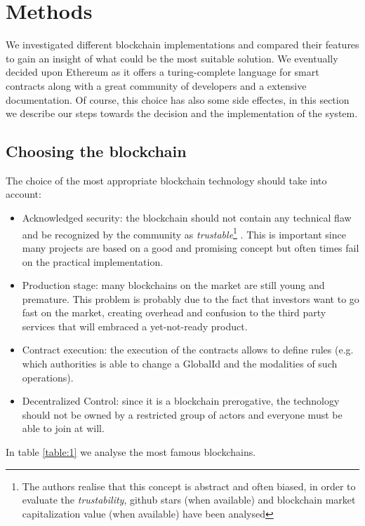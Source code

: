 \section{Methods}
\label{S:4}

We investigated different blockchain implementations and compared their features to gain an insight of what could be the most suitable solution. We eventually decided upon Ethereum as it offers a turing-complete language for smart contracts along with a great community of developers and a extensive documentation. Of course, this choice has also some side effectes, in this section we describe our steps towards the decision and the implementation of the system.  

\subsection{Choosing the blockchain}

The choice of the most appropriate blockchain technology should take into account:
\begin{itemize}
  \item Acknowledged security: the blockchain should not contain any technical flaw and be recognized by the community as \textit{trustable}\footnote{The authors realise that this concept is abstract and often biased, in order to evaluate the \textit{trustability}, github stars (when available) and blockchain market capitalization value (when available) have been analysed} . This is important since many projects are based on a good and promising concept but often times fail on the practical implementation.
  \item Production stage: many blockchains on the market are still young and premature. This problem is probably due to the fact that investors want to go fast on the market, creating overhead and confusion to the third party services that will embraced a yet-not-ready product.
  \item Contract execution: the execution of the contracts allows to define rules (e.g. which authorities is able to change a GlobalId and the modalities of such operations).
  \item Decentralized Control: since it is a blockchain prerogative, the technology should not be owned by a restricted group of actors and everyone must be able to join at will.
\end{itemize}

In table \ref{table:1} we analyse the most famous blockchains.

